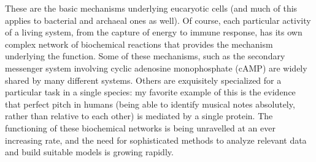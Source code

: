 These are the basic mechanisms underlying eucaryotic cells (and much of this
applies to bacterial and archaeal ones as well). Of course, each particular
activity of a living system, from the capture of energy to immune response, has
its own complex network of biochemical reactions that provides the mechanism
underlying the function. Some of these mechanisms, such as the secondary
messenger system involving cyclic adenosine monophosphate (cAMP) are widely
shared by many different systems. Others are exquisitely specialized for a
particular task in a single species: my favorite example of this is the evidence
that perfect pitch in humans (being able to identify musical notes absolutely,
rather than relative to each other) is mediated by a single protein. The
functioning of these biochemical networks is being unravelled at an ever
increasing rate, and the need for sophisticated methods to analyze relevant data
and build suitable models is growing rapidly.
